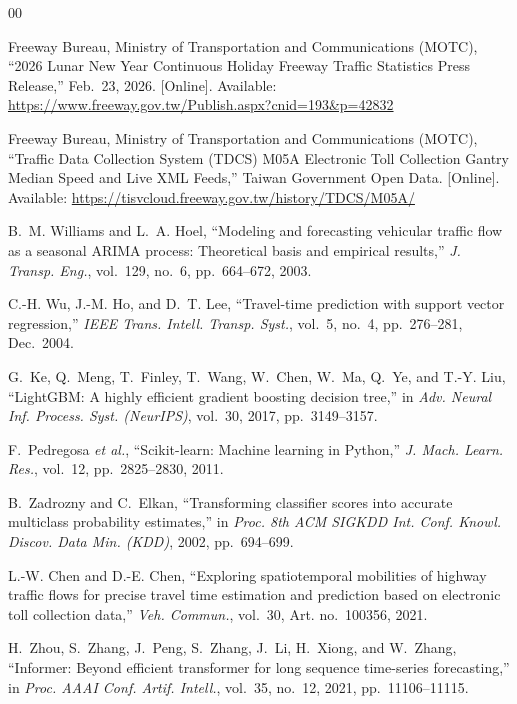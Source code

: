 \documentclass[conference]{IEEEtran}
\begin{document}
\begin{thebibliography}{00}

Freeway Bureau, Ministry of Transportation and Communications (MOTC), ``2026 Lunar New Year Continuous Holiday Freeway Traffic Statistics Press Release,'' Feb.~23, 2026. [Online]. Available: \url{https://www.freeway.gov.tw/Publish.aspx?cnid=193&p=42832}

Freeway Bureau, Ministry of Transportation and Communications (MOTC), ``Traffic Data Collection System (TDCS) M05A Electronic Toll Collection Gantry Median Speed and Live XML Feeds,'' Taiwan Government Open Data. [Online]. Available: \url{https://tisvcloud.freeway.gov.tw/history/TDCS/M05A/}

B.~M. Williams and L.~A. Hoel, ``Modeling and forecasting vehicular traffic flow as a seasonal ARIMA process: Theoretical basis and empirical results,'' \textit{J. Transp. Eng.}, vol.~129, no.~6, pp.~664--672, 2003.

C.-H. Wu, J.-M. Ho, and D.~T. Lee, ``Travel-time prediction with support vector regression,'' \textit{IEEE Trans. Intell. Transp. Syst.}, vol.~5, no.~4, pp.~276--281, Dec.~2004.

G.~Ke, Q.~Meng, T.~Finley, T.~Wang, W.~Chen, W.~Ma, Q.~Ye, and T.-Y. Liu, ``LightGBM: A highly efficient gradient boosting decision tree,'' in \textit{Adv. Neural Inf. Process. Syst. (NeurIPS)}, vol.~30, 2017, pp.~3149--3157.

F.~Pedregosa \textit{et al.}, ``Scikit-learn: Machine learning in Python,'' \textit{J. Mach. Learn. Res.}, vol.~12, pp.~2825--2830, 2011.

B.~Zadrozny and C.~Elkan, ``Transforming classifier scores into accurate multiclass probability estimates,'' in \textit{Proc. 8th ACM SIGKDD Int. Conf. Knowl. Discov. Data Min. (KDD)}, 2002, pp.~694--699.

L.-W. Chen and D.-E. Chen, ``Exploring spatiotemporal mobilities of highway traffic flows for precise travel time estimation and prediction based on electronic toll collection data,'' \textit{Veh. Commun.}, vol.~30, Art. no.~100356, 2021.

H.~Zhou, S.~Zhang, J.~Peng, S.~Zhang, J.~Li, H.~Xiong, and W.~Zhang, ``Informer: Beyond efficient transformer for long sequence time-series forecasting,'' in \textit{Proc. AAAI Conf. Artif. Intell.}, vol.~35, no.~12, 2021, pp.~11106--11115.


\end{thebibliography}
\end{document}
